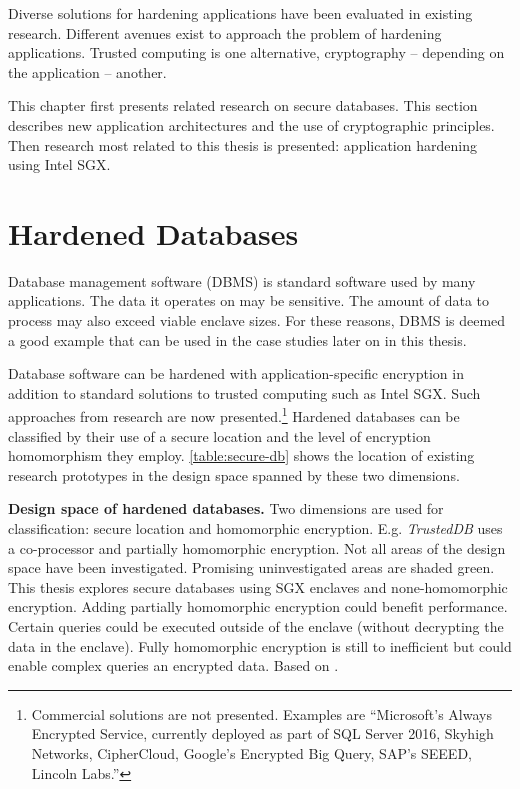 Diverse solutions for hardening applications have been evaluated in existing research.\label{ID_1120123601}
Different avenues exist to approach the problem of hardening applications.\label{ID_1831239377}
Trusted computing is one alternative, cryptography -- depending on the application -- another.\label{ID_1505185644}

This chapter first presents related research on secure databases. This section describes new application architectures and the use of cryptographic principles.\label{ID_994786687}
Then research most related to this thesis is presented: application hardening using Intel SGX.\label{ID_1005330540}

\section{Hardened Databases\label{ID_1295642147}\label{section:secure-db}}
Database management software (DBMS) is standard software used by many applications.\label{ID_5831466}
The data it operates on may be sensitive.\label{ID_1374032657}
The amount of data to process may also exceed viable enclave sizes.\label{ID_1026614233}
For these reasons, DBMS is deemed a good example that can be used in the case studies later on in this thesis.\label{ID_730883570}

Database software can be hardened with application-specific encryption in addition to standard solutions to trusted computing such as Intel SGX.\label{ID_1516733401}
Such approaches from research are now presented.\footnote{Commercial solutions are not presented. Examples are ``Microsoft’s Always Encrypted Service, currently deployed as part of SQL Server 2016, Skyhigh Networks, CipherCloud, Google’s Encrypted Big Query, SAP’s SEEED, Lincoln Labs.''\cite{Poddar2016}}\label{ID_1577896396}
Hardened databases can be classified by their use of a secure location and the level of encryption homomorphism they employ. \autoref{table:secure-db} shows the location of existing research prototypes in the design space spanned by these two dimensions.\label{ID_224045651}

\begin{table}
\centering

\caption{
\textbf{Design space of hardened databases.}\label{ID_1890259832}
Two dimensions are used for classification: secure location and homomorphic encryption. E.g. \textit{TrustedDB} uses a co-processor and partially homomorphic encryption.\label{ID_975475106}
Not all areas of the design space have been investigated.\label{ID_1304337948}
Promising uninvestigated areas are shaded green.\label{ID_414835333}
This thesis explores secure databases using SGX enclaves and none-homomorphic encryption.\label{ID_668431524}
Adding partially homomorphic encryption could benefit performance. Certain queries could be executed outside of the enclave (without decrypting the data in the enclave).\label{ID_1800743474}
Fully homomorphic encryption is still to inefficient but could enable complex queries an encrypted data.\label{ID_734875920}
Based on \cite{querying-encrypted-data-tutorial}.\label{ID_1452673010}
}
\label{table:secure-db}
\end{table}

